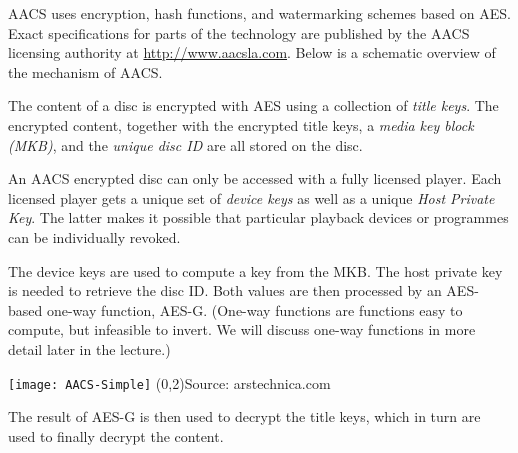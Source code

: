 
 AACS uses encryption, hash functions, and watermarking schemes
based on AES. Exact specifications for parts of the technology are published by
the AACS licensing authority at \url{http://www.aacsla.com}. Below is a
schematic overview of the mechanism of AACS.

\begin{minipage}{.5\linewidth}
  The content of a disc is encrypted with AES using a collection of \emph{title
    keys}. The encrypted content, together with the encrypted title keys, a
  \emph{media key block (MKB)}, and the \emph{unique disc ID} are all stored on
  the disc.

  An AACS encrypted disc can only be accessed with a fully licensed player. Each
  licensed player gets a unique set of \emph{device keys} as well as a unique
  \emph{Host Private Key}. The latter makes it possible that particular playback
  devices or programmes can be individually revoked.

  The device keys are used to compute a key from the MKB. The host private key
  is needed to retrieve the disc ID. Both values are then processed by an
  AES-based one-way function, AES-G.  (One-way functions are functions easy to
  compute, but infeasible to invert. We will discuss one-way functions in more
  detail later in the lecture.)
\end{minipage}
\begin{minipage}{.5\linewidth}
  \begin{center}
    \texttt{[image: AACS-Simple]}
    (0,2){\tiny Source:
      arstechnica.com}%
  \end{center}
\end{minipage}
The result of AES-G is then used to decrypt the title keys, which in turn are 
used to finally decrypt the content.


